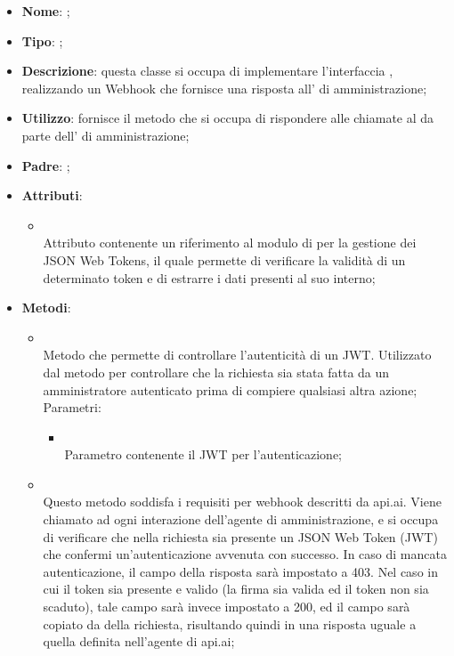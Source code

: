 \begin{itemize}
	\item \textbf{Nome}: ;
	\item \textbf{Tipo}: ;
	\item \textbf{Descrizione}: questa classe si occupa di implementare l'interfaccia , realizzando un Webhook che fornisce una risposta all' di amministrazione;
	\item \textbf{Utilizzo}: fornisce il metodo che si occupa di rispondere alle chiamate al  da parte dell' di amministrazione;
	\item \textbf{Padre}: ;
	\item \textbf{Attributi}:
	\begin{itemize}
		\item[]  \\
		Attributo contenente un riferimento al modulo di  per la gestione dei JSON Web Tokens, il quale permette di verificare la validità di un determinato token e di estrarre i dati presenti al suo interno;
	\end{itemize}
	\item \textbf{Metodi}:
	\begin{itemize}
		\item[]  \\		Metodo che permette di controllare l'autenticità di un JWT. Utilizzato dal metodo  per controllare che la richiesta sia stata fatta da un amministratore autenticato prima di compiere qualsiasi altra azione;\\
		Parametri:
		\begin{itemize}
			\item {} \\
			Parametro contenente il JWT per l'autenticazione;
		\end{itemize}
		\item[]  \\		Questo metodo soddisfa i requisiti per webhook descritti da api.ai. Viene chiamato ad ogni interazione dell'agente di amministrazione, e si occupa di verificare che nella richiesta sia presente un JSON Web Token (JWT) che confermi un'autenticazione avvenuta con successo. In caso di mancata autenticazione, il campo  della risposta sarà impostato a 403.  Nel caso in cui il token sia presente e valido (la firma sia valida ed il token non sia scaduto), tale campo sarà invece impostato a 200, ed il campo  sarà copiato da  della richiesta, risultando quindi in una risposta uguale a quella definita nell'agente di api.ai;\\

\end{itemize}
\end{itemize}
